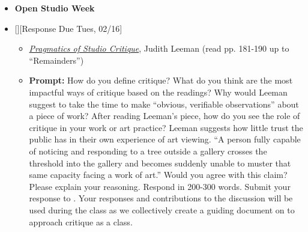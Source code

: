 \def\dMon{Mon, 02/15}
\def\dTues{Tues, 02/16}
\def\dWed{Wed, 02/17}
\def\dThur{Thur, 02/18}
\def\dFri{Fri, 02/19}
\def\dSat{Sat, 02/20}
\def\dSun{Sun, 02/21}
\placeDate

\begin{itemize}[noitemsep,topsep=0pt,leftmargin=*]
        \item \textcolor{defaultColor}{\textbf{Open Studio Week}}
        \item {}[][Response Due \dTues]
        \begin{itemize}
              \item \emph{\href{https://drive.google.com/file/d/1vUej0gK5nckVl6hvf68lcHJrh1w73h12/view?usp=sharing}{Pragmatics of Studio Critique}}, Judith Leeman {\footnotesize  (read pp. 181-190 up to ``Remainders'')}
              \item \textbf{Prompt:} How do you define critique? What do you think are the most impactful ways of critique based on the readings? Why would Leeman suggest to take the time to make ``obvious, verifiable observations'' about a piece of work? After reading Leeman's piece, how do you see the role of critique in your work or art practice? Leeman suggests how little trust the public has in their own experience of art viewing. ``A person fully capable of noticing and responding to a tree outside a gallery crosses the threshold into the gallery and becomes suddenly unable to muster that same capacity facing a work of art.'' Would you agree with this claim? Please explain your reasoning. Respond in 200-300 words. Submit your response to \discordR. Your responses and contributions to the discussion will be used during the class as we collectively create a guiding document on to approach critique as a class.
        \end{itemize}
\end{itemize}